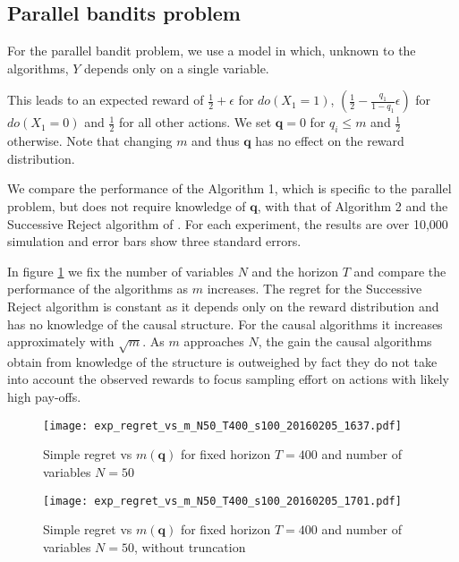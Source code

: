 \subsection{Parallel bandits problem}

For the parallel bandit problem, we use a model in which, unknown to the algorithms, $Y$ depends only on a single variable.

This leads to an expected reward of $\frac{1}{2}+\epsilon$ for $do(X_1=1)$, $\left(\frac{1}{2}-\frac{q_1}{1-q_1}\epsilon\right)$ for $do(X_1=0)$ and $\frac{1}{2}$ for all other actions. We set $\boldsymbol{q} = 0$ for $q_i \leq m$ and $\frac{1}{2}$ otherwise. Note that changing $m$ and thus $\boldsymbol{q}$ has no effect on the reward distribution. 

We compare the performance of the Algorithm 1, which is specific to the parallel problem, but does not require knowledge of $\boldsymbol{q}$, with that of Algorithm 2 and the Successive Reject algorithm of \cite{}. For each experiment, the results are over 10,000 simulation and error bars show three standard errors.

In figure \ref{fig:simple_vs_m} we fix the number of variables $N$ and the horizon $T$ and compare the performance of the algorithms as $m$ increases. The regret for the Successive Reject algorithm is constant as it depends only on the reward distribution and has no knowledge of the causal structure. For the causal algorithms it increases approximately with $\sqrt{m}$. As $m$ approaches $N$, the gain the causal algorithms obtain from knowledge of the structure is outweighed by fact they do not take into account the observed rewards to focus sampling effort on actions with likely high pay-offs.

\begin{figure}[h]
\caption{Simple regret vs $m(\boldsymbol{q})$ for fixed horizon $T=400$ and number of variables $N = 50$}
\label{fig:simple_vs_m}
\centering
\texttt{[image: exp\_regret\_vs\_m\_N50\_T400\_s100\_20160205\_1637.pdf]}
\end{figure}

\begin{figure}[h]
\caption{Simple regret vs $m(\boldsymbol{q})$ for fixed horizon $T=400$ and number of variables $N = 50$, without truncation}
\label{fig:simple_vs_m2}
\centering
\texttt{[image: exp\_regret\_vs\_m\_N50\_T400\_s100\_20160205\_1701.pdf]}
\end{figure}


